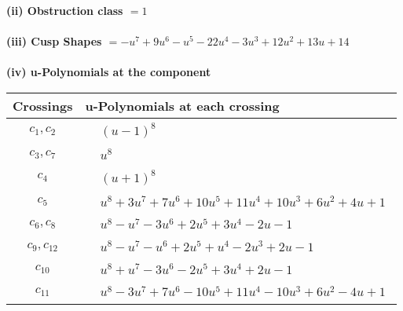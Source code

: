 \documentclass[1p]{elsarticle_modified}
\theoremstyle{definition}
\begin{document}
\flushleft \textbf{(ii) Obstruction class $= 1$}\\~\\
\flushleft \textbf{(iii) Cusp Shapes $= - u^7+9 u^6- u^5-22 u^4-3 u^3+12 u^2+13 u+14$}\\~\\
\newpage\renewcommand{\arraystretch}{1}
\flushleft \textbf{(iv) u-Polynomials at the component}\newline \\
\begin{tabular}{m{50pt}|m{274pt}}
Crossings & \hspace{64pt}u-Polynomials at each crossing \\
\hline $$\begin{aligned}c_{1},c_{2}\end{aligned}$$&$\begin{aligned}
&(u-1)^8
\end{aligned}$\\
\hline $$\begin{aligned}c_{3},c_{7}\end{aligned}$$&$\begin{aligned}
&u^8
\end{aligned}$\\
\hline $$\begin{aligned}c_{4}\end{aligned}$$&$\begin{aligned}
&(u+1)^8
\end{aligned}$\\
\hline $$\begin{aligned}c_{5}\end{aligned}$$&$\begin{aligned}
&u^8+3 u^7+7 u^6+10 u^5+11 u^4+10 u^3+6 u^2+4 u+1
\end{aligned}$\\
\hline $$\begin{aligned}c_{6},c_{8}\end{aligned}$$&$\begin{aligned}
&u^8- u^7-3 u^6+2 u^5+3 u^4-2 u-1
\end{aligned}$\\
\hline $$\begin{aligned}c_{9},c_{12}\end{aligned}$$&$\begin{aligned}
&u^8- u^7- u^6+2 u^5+u^4-2 u^3+2 u-1
\end{aligned}$\\
\hline $$\begin{aligned}c_{10}\end{aligned}$$&$\begin{aligned}
&u^8+u^7-3 u^6-2 u^5+3 u^4+2 u-1
\end{aligned}$\\
\hline $$\begin{aligned}c_{11}\end{aligned}$$&$\begin{aligned}
&u^8-3 u^7+7 u^6-10 u^5+11 u^4-10 u^3+6 u^2-4 u+1
\end{aligned}$\\
\hline
\end{tabular}\\~\\
\end{document}
